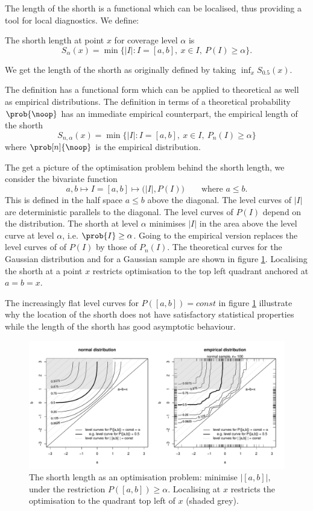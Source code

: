 \documentclass[dvips,12pt,a4paper,twoside]{amsart}
\newcommand{\gsnote}[1]{}
\newcommand{\gsnote}[1]{\marginpar{\textcolor{green}{#1}}}%
\begin{document}
The length of the shorth is a functional which can be localised, thus providing a tool for local diagnostics.
We define:
\begin{dfn} The shorth length  at point $x$ for coverage level $\alpha$ is
$$
S_\alpha(x)=  \min \{|I|: I=[a,b],\  x \in I,\  P(I) \geq \alpha\}.
$$ 
\label{dfn:shrth}
\end{dfn}

We get the length of the shorth as originally defined by taking $\inf_{x}S_{0.5}(x)$.

The definition has a functional form which can be applied to theoretical as well as empirical distributions. The definition in terms of a theoretical probability $\prob{\noop}$ has an immediate empirical counterpart, the empirical length of the shorth
$$
S_{n, \alpha}(x)=  \min \{|I|: I=[a,b],\   x  \in I,\  P_n(I) \geq \alpha\}
$$ 
where  $\prob[n]{\noop}$ is the empirical distribution.

The get a picture of the optimisation problem behind the shorth length, we consider the bivariate function
$$
a,b \longmapsto I = [a,b] \longmapsto \big( \left| I \right|, P\left(I\right) \big)\qquad \text{where } a \leq b.
$$
This is defined in the half space $a \leq b$ above the diagonal. The level curves of $ \left| I \right|$ are deterministic parallels to the diagonal. The level curves of $P(I)$ depend on the distribution. The shorth at level $\alpha$ minimises $\left| I \right|$ in the area above the level curve at level 
$\alpha$, i.e. $\prob{I} \geq \alpha$. Going to the empirical version replaces the level curves of of $P(I)$ by those of  $P_n(I)$. 
The theoretical curves for the Gaussian distribution and for a  Gaussian sample are shown in figure \ref{fig:level}.
 Localising the shorth at a point $x$ restricts optimisation to the top left quadrant anchored at $a=b=x$.
 
\gsnote{paragraph added}The increasingly flat level curves for $P([a,b]) = const$  in figure \ref{fig:level} illustrate why the location of the shorth does not have satisfactory statistical properties while the length of the shorth has good asymptotic behaviour.

\begin{figure}[htb]
\includegraphics[width=1.0\linewidth]{TheShorthPlot-level}
\caption{The shorth length as an optimisation problem: minimise $| [a,b] |,$ 
under the restriction $P([a,b] ) \geq \alpha$. Localising at $x$ restricts the optimisation  to the quadrant top left of $x$ (shaded grey).}
\label{fig:level}
\end{figure}
\end{document}
